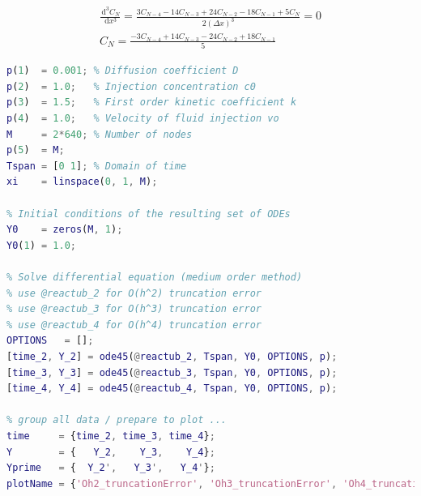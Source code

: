 \documentclass{article}
\newcommand{\ud}{\,\mathrm{d}}
\begin{document}
\begin{equation}
\begin{aligned}
\frac{\ud^3 C_N}{\ud x^3} = \frac{3 C_{N-4} - 14 C_{N-3} + 24 C_{N-2} - 18 C_{N-1} + 5 C_N}{2 \left( \Delta x \right)^3} = 0 \\
C_N = \frac{- 3 C_{N-4} + 14 C_{N-3} - 24 C_{N-2} + 18 C_{N-1}}{5}
\end{aligned}
\label{eq:reactorAEform_Oh4}
\end{equation}

\begin{lstlisting}[language=Matlab, caption=Reactor : Runge-Kutta ODE solver, label=lis:reactorRungeKuttaODEsolver]
%% Runge-Kutta
p(1)  = 0.001; % Diffusion coefficient D
p(2)  = 1.0;   % Injection concentration c0
p(3)  = 1.5;   % First order kinetic coefficient k
p(4)  = 1.0;   % Velocity of fluid injection vo
M     = 2*640; % Number of nodes
p(5)  = M;
Tspan = [0 1]; % Domain of time
xi    = linspace(0, 1, M);

% Initial conditions of the resulting set of ODEs
Y0    = zeros(M, 1);
Y0(1) = 1.0;

% Solve differential equation (medium order method)
% use @reactub_2 for O(h^2) truncation error
% use @reactub_3 for O(h^3) truncation error
% use @reactub_4 for O(h^4) truncation error
OPTIONS   = [];
[time_2, Y_2] = ode45(@reactub_2, Tspan, Y0, OPTIONS, p);
[time_3, Y_3] = ode45(@reactub_3, Tspan, Y0, OPTIONS, p);
[time_4, Y_4] = ode45(@reactub_4, Tspan, Y0, OPTIONS, p);

% group all data / prepare to plot ...
time     = {time_2, time_3, time_4};
Y        = {   Y_2,    Y_3,    Y_4};
Yprime   = {  Y_2',   Y_3',   Y_4'};
plotName = {'Oh2_truncationError', 'Oh3_truncationError', 'Oh4_truncationError'};
\end{lstlisting}
\end{document}
